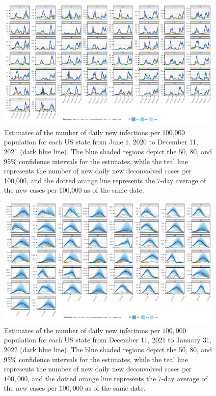 \documentclass{article}
\begin{document}
\begin{landscape}
\thispagestyle{empty}
\begin{figure}[!tb]
    \centering
    \includegraphics[width=.99\linewidth]{state_niauc_before_dec11.pdf} 
    \caption{Estimates of the number of daily new infections per
     100,000 population for each US state from June 1, 2020 to December 11, 2021
      (dark blue line). The blue shaded regions depict the 50, 80, and 95\% confidence 
      intervals for the estimates, while the teal line represents the 
      number of new daily new deconvolved cases per 100,000, and the dotted 
      orange line represents the 7-day average of the new cases per 100,000 as 
      of the same date.}
    \label{fig:state_est_upto_dec1121}
\fillandplacepagenumber
\end{figure}
\end{landscape}

\begin{landscape}
\thispagestyle{empty}
\begin{figure}[!tb]
     \hspace*{-1.5cm}\includegraphics[width=1.55\textwidth]{state_niauc_after_dec11.pdf} 
    \caption{Estimates of the number of daily new infections per
     $100,000$ population for each US state from December 11, 2021 to January 31, 2022
      (dark blue line). The blue shaded regions depict the 50, 80, and 95\% confidence 
      intervals for the estimates, while the teal line represents the 
      number of new daily new deconvolved cases per $100,000$, and the dotted 
      orange line represents the 7-day average of the new cases per $100,000$ as 
      of the same date.}
    \label{fig:state_est_after_dec1121}
\fillandplacepagenumber
\end{figure}
\end{landscape}
\end{document}
